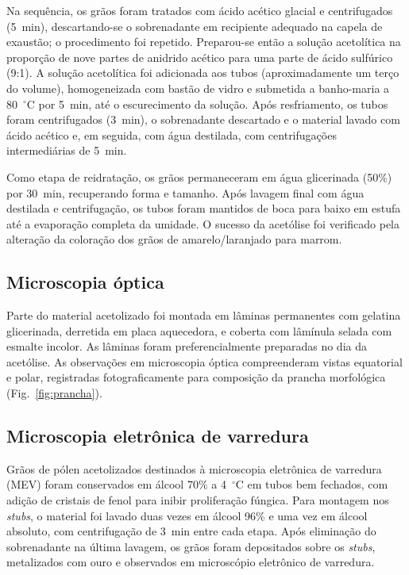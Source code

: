 \documentclass[pdflatex,sn-mathphys-num]{sn-jnl}
\begin{document}
Na sequência, os grãos foram tratados com ácido acético glacial e centrifugados (5~min), descartando-se o sobrenadante em recipiente adequado na capela de exaustão; o procedimento foi repetido. Preparou-se então a solução acetolítica na proporção de nove partes de anidrido acético para uma parte de ácido sulfúrico (9:1). A solução acetolítica foi adicionada aos tubos (aproximadamente um terço do volume), homogeneizada com bastão de vidro e submetida a banho-maria a 80~$^{\circ}$C por 5~min, até o escurecimento da solução. Após resfriamento, os tubos foram centrifugados (3~min), o sobrenadante descartado e o material lavado com ácido acético e, em seguida, com água destilada, com centrifugações intermediárias de 5~min.

Como etapa de reidratação, os grãos permaneceram em água glicerinada (50\%) por 30~min, recuperando forma e tamanho. Após lavagem final com água destilada e centrifugação, os tubos foram mantidos de boca para baixo em estufa até a evaporação completa da umidade. O sucesso da acetólise foi verificado pela alteração da coloração dos grãos de amarelo/laranjado para marrom.

\subsection{Microscopia óptica}\label{subsec:mo}

Parte do material acetolizado foi montada em lâminas permanentes com gelatina glicerinada, derretida em placa aquecedora, e coberta com lâmínula selada com esmalte incolor. As lâminas foram preferencialmente preparadas no dia da acetólise. As observações em microscopia óptica compreenderam vistas equatorial e polar, registradas fotograficamente para composição da prancha morfológica (Fig.~\ref{fig:prancha}).

\subsection{Microscopia eletrônica de varredura}\label{subsec:mev}

Grãos de pólen acetolizados destinados à microscopia eletrônica de varredura (MEV) foram conservados em álcool 70\% a 4~$^{\circ}$C em tubos bem fechados, com adição de cristais de fenol para inibir proliferação fúngica. Para montagem nos \textit{stubs}, o material foi lavado duas vezes em álcool 96\% e uma vez em álcool absoluto, com centrifugação de 3~min entre cada etapa. Após eliminação do sobrenadante na última lavagem, os grãos foram depositados sobre os \textit{stubs}, metalizados com ouro e observados em microscópio eletrônico de varredura.
\end{document}
